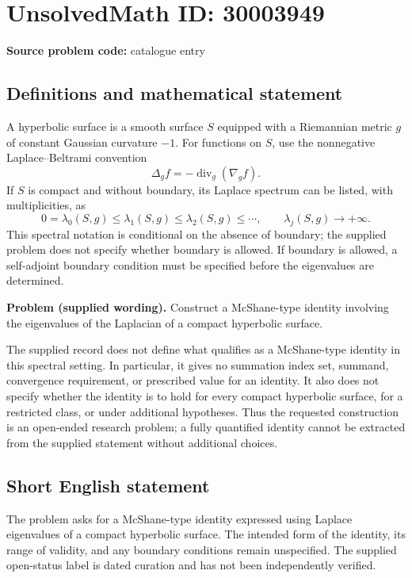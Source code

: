 \documentclass[11pt]{article}
\begin{document}
\section*{UnsolvedMath ID: 30003949}
\textbf{Source problem code:} catalogue entry
\subsection{Definitions and mathematical statement}
A hyperbolic surface is a smooth surface \(S\) equipped with a Riemannian metric \(g\) of constant Gaussian curvature \(-1\). For functions on \(S\), use the nonnegative Laplace--Beltrami convention
\[
\Delta_g f=-\operatorname{div}_g(\nabla_g f).
\]
If \(S\) is compact and without boundary, its Laplace spectrum can be listed, with multiplicities, as
\[
0=\lambda_0(S,g)\leq\lambda_1(S,g)\leq\lambda_2(S,g)\leq\cdots,
\qquad \lambda_j(S,g)\longrightarrow+\infty.
\]
This spectral notation is conditional on the absence of boundary; the supplied problem does not specify whether boundary is allowed. If boundary is allowed, a self-adjoint boundary condition must be specified before the eigenvalues are determined.

\textbf{Problem (supplied wording).} Construct a McShane-type identity involving the eigenvalues of the Laplacian of a compact hyperbolic surface.

The supplied record does not define what qualifies as a McShane-type identity in this spectral setting. In particular, it gives no summation index set, summand, convergence requirement, or prescribed value for an identity. It also does not specify whether the identity is to hold for every compact hyperbolic surface, for a restricted class, or under additional hypotheses. Thus the requested construction is an open-ended research problem; a fully quantified identity cannot be extracted from the supplied statement without additional choices.
\subsection{Short English statement}
The problem asks for a McShane-type identity expressed using Laplace eigenvalues of a compact hyperbolic surface. The intended form of the identity, its range of validity, and any boundary conditions remain unspecified. The supplied open-status label is dated curation and has not been independently verified.
\end{document}

